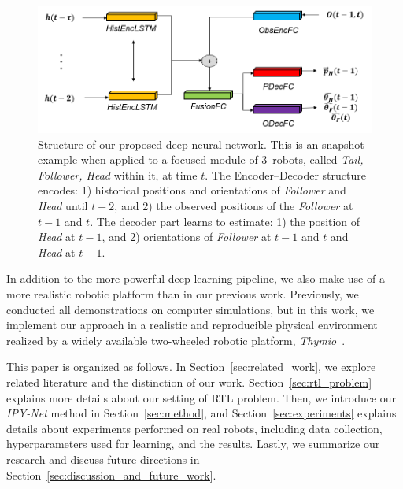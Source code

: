 \documentclass[letterpaper, 10 pt, conference]{ieeeconf}  %
\begin{document}
	\begin{figure}\centering
		\includegraphics[width=1.\columnwidth]{fig_DL_Pipeline}
		\caption{Structure of our proposed deep neural network.
			This is an snapshot example when applied to a focused module of
			$3$~robots, called \emph{Tail, Follower, Head} within it, at time $t$.
            The Encoder--Decoder structure encodes: 1) historical
            positions and orientations of \emph{Follower} and \emph{Head}
            until $t-2$, and 2) the observed positions of the \emph{Follower} at
            $t-1$ and $t$. The decoder part learns to estimate: 1) the
            position of \emph{Head} at $t-1$, and 2) orientations of
            \emph{Follower} at $t-1$ and $t$ and \emph{Head} at $t-1$.
		}
		\label{fig:DL_Pipeline}
	\end{figure}
    In addition to the more powerful deep-learning pipeline, we also
    make use of a more realistic robotic platform than in our previous
    work. Previously, we conducted all demonstrations on computer
    simulations, but in this work, we implement our approach in a
    realistic and reproducible physical environment realized by a widely
    available two-wheeled robotic platform, \emph{Thymio}~\cite{Shin14}.


    This paper is organized as follows. In
    Section~\ref{sec:related_work}, we explore related literature and
    the distinction of our work. Section~\ref{sec:rtl_problem} explains
    more details about our setting of RTL problem. Then, we introduce
    our \emph{IPY-Net} method in Section~\ref{sec:method}, and
    Section~\ref{sec:experiments} explains details about experiments
    performed on real robots, including data collection, hyperparameters
    used for learning, and the results. Lastly, we summarize our
    research and discuss future directions in
    Section~\ref{sec:discussion_and_future_work}.
\end{document}
